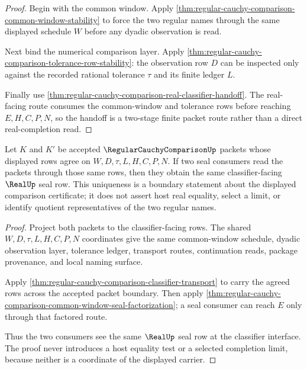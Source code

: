 \begin{proof}
Begin with the common window. Apply \autoref{thm:regular-cauchy-comparison-common-window-stability} to force the two regular names through the same displayed schedule $W$ before any dyadic observation is read.

Next bind the numerical comparison layer. Apply \autoref{thm:regular-cauchy-comparison-tolerance-row-stability}: the observation row $D$ can be inspected only against the recorded rational tolerance $\tau$ and its finite ledger $L$.

Finally use \autoref{thm:regular-cauchy-comparison-real-classifier-handoff}. The real-facing route consumes the common-window and tolerance rows before reaching $E,H,C,P,N$, so the handoff is a two-stage finite packet route rather than a direct real-completion read.
\end{proof}

\begin{theorem}
\label{thm:regular-cauchy-comparison-seal-uniqueness-boundary}
Let $K$ and $K'$ be accepted $\RegularCauchyComparisonUp$ packets whose displayed rows agree on $W,D,\tau,L,H,C,P,N$. If two seal consumers read the packets through those same rows, then they obtain the same classifier-facing $\RealUp$ seal row. This uniqueness is a boundary statement about the displayed comparison certificate; it does not assert host real equality, select a limit, or identify quotient representatives of the two regular names.
\end{theorem}

\begin{proof}
Project both packets to the classifier-facing rows. The shared $W,D,\tau,L,H,C,P,N$ coordinates give the same common-window schedule, dyadic observation layer, tolerance ledger, transport routes, continuation reads, package provenance, and local naming surface.

Apply \autoref{thm:regular-cauchy-comparison-classifier-transport} to carry the agreed rows across the accepted packet boundary. Then apply \autoref{thm:regular-cauchy-comparison-common-window-seal-factorization}; a seal consumer can reach $E$ only through that factored route.

Thus the two consumers see the same $\RealUp$ seal row at the classifier interface. The proof never introduces a host equality test or a selected completion limit, because neither is a coordinate of the displayed carrier.
\end{proof}

